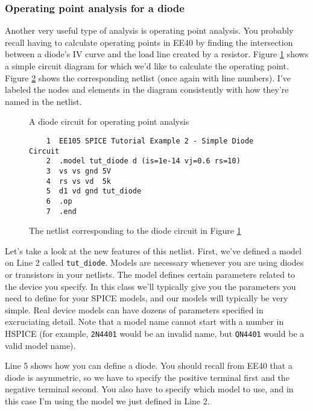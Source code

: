 \documentclass{article}
\begin{document}
\subsubsection{Operating point analysis for a diode}

Another very useful type of analysis is operating point analysis. You probably recall having to calculate operating points in EE40 by finding the intersection between a diode's IV curve and the load line created by a resistor. Figure \ref{opdiagram} shows a simple circuit diagram for which we'd like to calculate the operating point. Figure \ref{opnetlist} shows the corresponding netlist (once again with line numbers). I've labeled the nodes and elements in the diagram consistently with how they're named in the netlist.

\begin{figure}[!htb]
  
  \centerline{\box\graph}
  \caption{A diode circuit for operating point analysis}
  \label{opdiagram}
\end{figure}

\begin{figure}[!htb]
  \begin{verbatim}
    1  EE105 SPICE Tutorial Example 2 - Simple Diode Circuit
    2  .model tut_diode d (is=1e-14 vj=0.6 rs=10)
    3  vs vs gnd 5V
    4  rs vs vd  5k
    5  d1 vd gnd tut_diode
    6  .op
    7  .end \end{verbatim}
  \caption{The netlist corresponding to the diode circuit in Figure \ref{opdiagram}}
  \label{opnetlist}
\end{figure}

Let's take a look at the new features of this netlist. First, we've defined a model on Line 2 called \verb|tut_diode|. Models are necessary whenever you are using diodes or transistors in your netlists. The model defines certain parameters related to the device you specify. In this class we'll typically give you the parameters you need to define for your SPICE models, and our models will typically be very simple. Real device models can have dozens of parameters specified in excruciating detail. Note that a model name cannot start with a number in HSPICE (for example, \verb|2N4401| would be an invalid name, but \verb|QN4401| would be a valid model name).

Line 5 shows how you can define a diode. You should recall from EE40 that a diode is asymmetric, so we have to specify the positive terminal first and the negative terminal second. You also have to specify which model to use, and in this case I'm using the model we just defined in Line 2.
\end{document}
